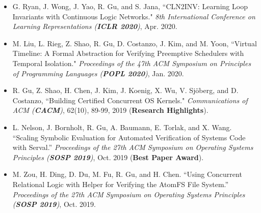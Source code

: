 \documentclass[10pt]{article}
\newenvironment{innerlist}[1][\enskip\textbullet]%
        {\begin{itemize}[#1,leftmargin=25pt,parsep=0pt,itemsep=2pt,topsep=2pt,partopsep=0pt]}
        {\end{itemize}}
\begin{document}
\begin{innerlist}
%
%
%

\item[] G. Ryan, J. Wong, J. Yao, R. Gu, and S. Jana, ``CLN2INV: Learning Loop Invariants with Continuous Logic Networks." \emph{8th International Conference on Learning Representations (\textbf{ICLR 2020})}, Apr. 2020.

\vspace{.1in}


\item[] M. Liu, L. Rieg, Z. Shao, R. Gu, D. Costanzo, J. Kim, and M. Yoon, ``Virtual Timeline: A Formal Abstraction for Verifying Preemptive Schedulers with Temporal Isolation." \emph{Proceedings of the 47th ACM Symposium on Principles of Programming Languages (\textbf{POPL 2020})}, Jan. 2020.

\vspace{.1in}



\item[] R. Gu, Z. Shao, H. Chen, J. Kim, J. Koenig, X. Wu, V. Sj\"{o}berg, and D. Costanzo, ``Building Certified Concurrent OS Kernels." \emph{Communications of ACM (\textbf{CACM})}, 62(10), 89-99, 2019  (\textbf{Research Highlights}).

\vspace{.1in}

\item[]  L. Nelson, J. Bornholt, R. Gu, A. Baumann, E. Torlak, and X. Wang. ``Scaling Symbolic Evaluation for Automated Verification of Systems Code with Serval.'' \emph{Proceedings of the 27th ACM Symposium on Operating Systems Principles (\textbf{SOSP 2019})}, 
              Oct. 2019 (\textbf{Best Paper Award}).    
            
\vspace{.1in}

\item[]  M. Zou, H. Ding, D. Du, M. Fu, R. Gu, and H. Chen. ``Using Concurrent Relational Logic with Helper for Verifying the AtomFS File System.'' \emph{Proceedings of the 27th ACM Symposium on Operating Systems Principles (\textbf{SOSP 2019})}, Oct. 2019.
           

\end{innerlist}
\end{document}
